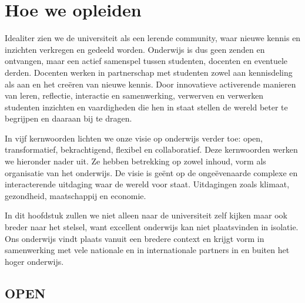 \documentclass[empirical, authordate, ]{new-jote-article}
\begin{document}
	\section{Hoe we opleiden}



	Idealiter zien we de universiteit als een lerende community, waar nieuwe kennis en inzichten verkregen en gedeeld worden. Onderwijs is dus geen zenden en ontvangen, maar een actief samenspel tussen studenten, docenten en eventuele derden. Docenten werken in partnerschap met studenten zowel aan kennisdeling als aan en het creëren van nieuwe kennis. Door innovatieve activerende manieren van leren, reflectie, interactie en samenwerking, verwerven en verwerken studenten inzichten en vaardigheden die hen in staat stellen de wereld beter te begrijpen en daaraan bij te dragen.



	In vijf kernwoorden lichten we onze visie op onderwijs verder toe: open, transformatief, bekrachtigend, flexibel en collaboratief. Deze kernwoorden werken we hieronder nader uit. Ze hebben betrekking op zowel inhoud, vorm als organisatie van het onderwijs. De visie is geënt op de ongeëvenaarde complexe en interacterende uitdaging waar de wereld voor staat. Uitdagingen zoals klimaat, gezondheid, maatschappij en economie.



	In dit hoofdstuk zullen we niet alleen naar de universiteit zelf kijken maar ook breder naar het stelsel, want excellent onderwijs kan niet plaatsvinden in isolatie. Ons onderwijs vindt plaats vanuit een bredere context en krijgt vorm in samenwerking met vele nationale en in internationale partners in en buiten het hoger onderwijs.



	\subsection{OPEN}
\end{document}
